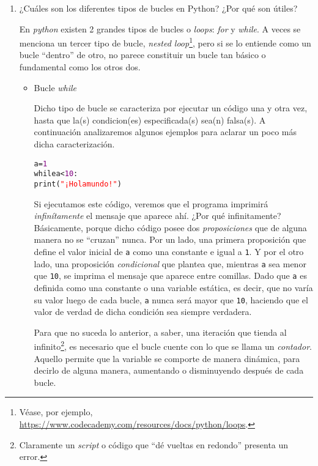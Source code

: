 \documentclass{article}
\begin{document}
\begin{enumerate}
\item ¿Cuáles son los diferentes tipos de bucles en Python? ¿Por qué son útiles?
\par \hspace{5pt} En \emph{python} existen 2 grandes tipos de bucles o \emph{loops}: \emph{for} y \emph{while}. A veces se menciona un tercer tipo de bucle, \emph{nested loop}\footnote{Véase, por ejemplo, \url{https://www.codecademy.com/resources/docs/python/loops}.}, pero si se lo entiende como un bucle ``dentro'' de otro, no parece constituir un bucle tan básico o fundamental como los otros dos.
\begin{itemize}
\item Bucle \emph{while}
\par \hspace{5pt} Dicho tipo de bucle se caracteriza por ejecutar un código una y otra vez, hasta que la(s) condicion(es) especificada(s) sea(n) falsa(s). A continuación analizaremos algunos ejemplos para aclarar un poco más dicha caracterización.
\begin{tcolorbox}
\begin{alltt}
a = \textcolor{purple}{1}
while a < \textcolor{purple}{10}:
  print(\textcolor{red}{"¡Hola mundo!"})
\end{alltt}        
\end{tcolorbox}
\par \hspace{5pt} Si ejecutamos este código, veremos que el programa imprimirá \emph{infinítamente} el mensaje que aparece ahí. ¿Por qué infinitamente? Básicamente, porque dicho código posee dos \emph{proposiciones} que de alguna manera no se ``cruzan'' nunca. Por un lado, una primera proposición que define el valor inicial de \verb|a| como una constante e igual a \verb|1|. Y por el otro lado, una proposición \emph{condicional} que plantea que, mientras \verb|a| sea menor que \verb|10|, se imprima el mensaje que aparece entre comillas.  Dado que \verb|a| es definida como una constante o una variable estática, es decir, que no varía su valor luego de cada bucle, \verb|a| nunca será mayor que \verb|10|, haciendo que el valor de verdad de dicha condición sea siempre verdadera.
\par \hspace{5pt} Para que no suceda lo anterior, a saber, una iteración que tienda al infinito\footnote{Claramente un \emph{script} o código que ``dé vueltas en redondo'' presenta un error.}, es necesario que el bucle cuente con lo que se llama un \emph{contador}. Aquello permite que la variable se comporte de manera dinámica, para decirlo de alguna manera, aumentando o disminuyendo después de cada bucle.

\end{itemize}
\end{enumerate}
\end{document}
